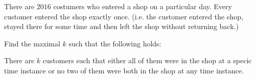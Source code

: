 There are $2016$ costumers who entered a shop on a particular day. Every customer entered the shop exactly once. (i.e. the customer entered the shop, stayed there for some time and then left the shop without returning back.)

Find the maximal $k$ such that the following holds:

There are $k$ customers such that either all of them were in the shop at a specic time instance or no two of them were both in the shop at any time instance.